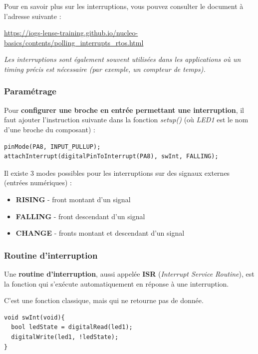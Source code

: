 \documentclass[a4paper,11pt,titlepage]{article} %
\begin{document}
Pour en savoir plus sur les interruptions, vous pouvez consulter le document à l'adresse suivante :

\href{https://iogs-lense-training.github.io/nucleo-basics/contents/polling_interrupts_rtos.html}{https://iogs-lense-training.github.io/nucleo-basics/contents/polling\_interrupts\_rtos.html}

\textit{Les interruptions sont également souvent utilisées dans les applications où un timing précis est nécessaire (par exemple, un compteur de temps).}


\subsubsection{Paramétrage}

Pour \textbf{configurer une broche en entrée permettant une interruption}, il faut ajouter l'instruction suivante dans la fonction \textsl{setup()} (où \textsl{LED1} est le nom d'une broche du composant) :

\begin{lstlisting}
pinMode(PA8, INPUT_PULLUP);
attachInterrupt(digitalPinToInterrupt(PA8), swInt, FALLING); 
\end{lstlisting}

Il existe 3 modes possibles pour les interruptions sur des signaux externes (entrées numériques) : 

\begin{itemize}
	\item \textbf{RISING} - front montant d'un signal
	\item \textbf{FALLING} - front descendant d'un signal
	\item \textbf{CHANGE} - fronts montant et descendant d'un signal
\end{itemize}


\subsubsection{Routine d'interruption}

Une \textbf{routine d'interruption}, aussi appelée \textbf{ISR} (\textit{Interrupt Service Routine}), est la fonction qui s'exécute automatiquement en réponse à une interruption. 

C'est une fonction classique, mais qui ne retourne pas de donnée.

\begin{lstlisting}
void swInt(void){
  bool ledState = digitalRead(led1);
  digitalWrite(led1, !ledState);
} 
\end{lstlisting}
\end{document}

